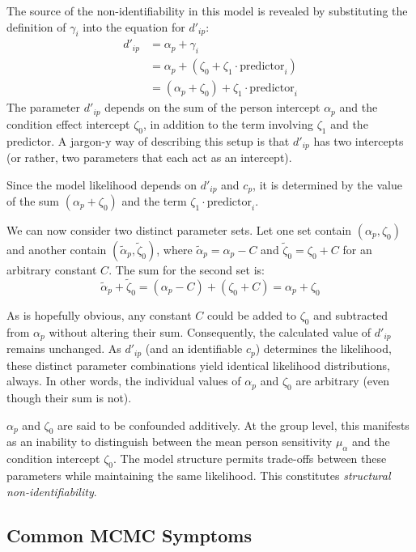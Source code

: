 \documentclass[12pt]{article}
\begin{document}
The source of the non-identifiability in this model is revealed by substituting the definition of $\gamma_i$ into the equation for $d'_{ip}$:
\begin{align*}
  d'_{ip} &= \alpha_p + \gamma_i \\
         &= \alpha_p + (\zeta_0 + \zeta_1 \cdot \text{predictor}_i) \\
         &= (\alpha_p + \zeta_0) + \zeta_1 \cdot \text{predictor}_i
\end{align*}
The parameter $d'_{ip}$ depends on the sum of the person intercept $\alpha_p$ and the condition effect intercept $\zeta_0$, in addition to the term involving $\zeta_1$ and the predictor.  A jargon-y way of describing this setup is that $d'_{ip}$ has two intercepts (or rather, two parameters that each act as an intercept).

Since the model likelihood depends on $d'_{ip}$ and $c_p$, it is determined by the value of the sum $(\alpha_p + \zeta_0)$ and the term $\zeta_1 \cdot \text{predictor}_i$.

We can now consider two distinct parameter sets. Let one set contain $(\alpha_p, \zeta_0)$ and another contain $(\tilde{\alpha}_p, \tilde{\zeta}_0)$, where $\tilde{\alpha}_p = \alpha_p - C$ and $\tilde{\zeta}_0 = \zeta_0 + C$ for an arbitrary constant $C$. The sum for the second set is:
\[ \tilde{\alpha}_p + \tilde{\zeta}_0 = (\alpha_p - C) + (\zeta_0 + C) = \alpha_p + \zeta_0 \]

As is hopefully obvious, any constant $C$ could be added to $\zeta_0$ and subtracted from $\alpha_p$ without altering their sum. Consequently, the calculated value of $d'_{ip}$ remains unchanged. As $d'_{ip}$ (and an identifiable $c_p$) determines the likelihood, these distinct parameter combinations yield identical likelihood distributions, always.  In other words, the individual values of $\alpha_p$ and $\zeta_0$ are arbitrary (even though their sum is not).

$\alpha_p$ and $\zeta_0$ are said to be confounded additively. At the group level, this manifests as an inability to distinguish between the mean person sensitivity $\mu_\alpha$ and the condition intercept $\zeta_0$. The model structure permits trade-offs between these parameters while maintaining the same likelihood. This constitutes \emph{structural non-identifiability}.


\subsection*{Common MCMC Symptoms}
\end{document}

